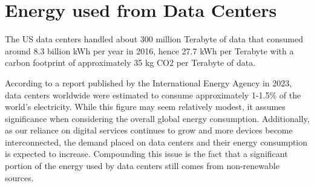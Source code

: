 \documentclass[
  a4paper,  %
  twoside,  %
  bibliography=totoc,
  headsepline,
  cleardoublepage=empty,
  parskip=half,
  draft=false
]{scrbook}
\begin{document}







\chapter{Energy used from Data Centers}\label{chap4}

The US data centers handled about 300 million Terabyte of data that consumed around 8.3 billion kWh per year in 2016, hence 27.7 kWh per Terabyte with a carbon footprint of approximately 35 kg CO2 per Terabyte of data\cite{corbett2018sustainable}.

According to a report published by the International Energy Agency\cite{ieaDataCentres} in 2023, data centers worldwide were estimated to consume approximately 1-1.5\% of the world's electricity. While this figure may seem relatively modest, it assumes significance when considering the overall global energy consumption. Additionally, as our reliance on digital services continues to grow and more devices become interconnected, the demand placed on data centers and their energy consumption is expected to increase\cite{schomaker2015energy}. Compounding this issue is the fact that a significant portion of the energy used by data centers still comes from non-renewable sources\cite{ritchie2024energy}.
\end{document}

